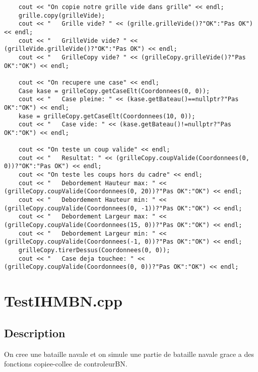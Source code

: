 \begin{lstlisting}
    cout << "On copie notre grille vide dans grille" << endl;
    grille.copy(grilleVide);
    cout << "   Grille vide? " << (grille.grilleVide()?"OK":"Pas OK") << endl;
    cout << "   GrilleVide vide? " << (grilleVide.grilleVide()?"OK":"Pas OK") << endl;
    cout << "   GrilleCopy vide? " << (grilleCopy.grilleVide()?"Pas OK":"OK") << endl;

    cout << "On recupere une case" << endl;
    Case kase = grilleCopy.getCaseElt(Coordonnees(0, 0));
    cout << "   Case pleine: " << (kase.getBateau()==nullptr?"Pas OK":"OK") << endl;
    kase = grilleCopy.getCaseElt(Coordonnees(10, 0));
    cout << "   Case vide: " << (kase.getBateau()!=nullptr?"Pas OK":"OK") << endl;

    cout << "On teste un coup valide" << endl;
    cout << "   Resultat: " << (grilleCopy.coupValide(Coordonnees(0, 0))?"OK":"Pas OK") << endl;
    cout << "On teste les coups hors du cadre" << endl;
    cout << "   Debordement Hauteur max: " << (grilleCopy.coupValide(Coordonnees(0, 20))?"Pas OK":"OK") << endl;
    cout << "   Debordement Hauteur min: " << (grilleCopy.coupValide(Coordonnees(0, -1))?"Pas OK":"OK") << endl;
    cout << "   Debordement Largeur max: " << (grilleCopy.coupValide(Coordonnees(15, 0))?"Pas OK":"OK") << endl;
    cout << "   Debordement Largeur min: " << (grilleCopy.coupValide(Coordonnees(-1, 0))?"Pas OK":"OK") << endl;
    grilleCopy.tirerDessus(Coordonnees(0, 0));
    cout << "   Case deja touchee: " << (grilleCopy.coupValide(Coordonnees(0, 0))?"Pas OK":"OK") << endl;	
	\end{lstlisting}
    \section{TestIHMBN.cpp}
        \subsection{Description}
            On cree une bataille navale et on simule une partie de bataille navale grace a des fonctions copiee-collee de controleurBN.
